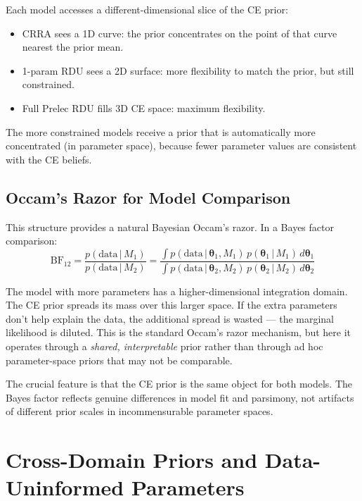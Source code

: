 \documentclass[11pt,a4paper]{article}
\theoremstyle{definition}
\newcommand{\given}{\,|\,}
\newcommand{\btheta}{\boldsymbol{\theta}}
\begin{document}
Each model accesses a different-dimensional slice of the CE prior:
\begin{itemize}
    \item CRRA sees a 1D curve: the prior concentrates on the point of that
    curve nearest the prior mean.
    \item 1-param RDU sees a 2D surface: more flexibility to match the
    prior, but still constrained.
    \item Full Prelec RDU fills 3D CE space: maximum flexibility.
\end{itemize}

The more constrained models receive a prior that is automatically more
concentrated (in parameter space), because fewer parameter values are
consistent with the CE beliefs.

\subsection{Occam's Razor for Model Comparison}

This structure provides a natural Bayesian Occam's razor. In a Bayes factor
comparison:
\begin{equation}
    \text{BF}_{12} = \frac{p(\text{data} \given M_1)}{p(\text{data} \given M_2)}
    = \frac{\int p(\text{data} \given \btheta_1, M_1) \,
    p(\btheta_1 \given M_1) \, d\btheta_1}
    {\int p(\text{data} \given \btheta_2, M_2) \,
    p(\btheta_2 \given M_2) \, d\btheta_2}
\end{equation}

The model with more parameters has a higher-dimensional integration domain.
The CE prior spreads its mass over this larger space. If the extra parameters
don't help explain the data, the additional spread is wasted --- the marginal
likelihood is diluted. This is the standard Occam's razor mechanism, but here
it operates through a \emph{shared, interpretable} prior rather than through
ad hoc parameter-space priors that may not be comparable.

The crucial feature is that the CE prior is the same object for both models.
The Bayes factor reflects genuine differences in model fit and parsimony, not
artifacts of different prior scales in incommensurable parameter spaces.


\section{Cross-Domain Priors and Data-Uninformed Parameters}
\label{sec:cross_domain}
\end{document}
